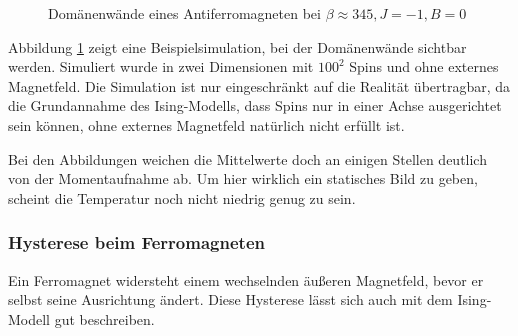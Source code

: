 \begin{figure}[h]
  \hfill
  \caption{Domänenwände eines Antiferromagneten bei $\beta\approx 345, J=-1, B=0$\label{domainwall}}
\end{figure}
Abbildung \ref{domainwall} zeigt eine Beispielsimulation, bei der Domänenwände sichtbar werden.
Simuliert wurde in zwei Dimensionen mit $100^2$ Spins und ohne externes Magnetfeld.
Die Simulation ist nur eingeschränkt auf die Realität übertragbar, da die Grundannahme des Ising-Modells, dass Spins nur in einer Achse ausgerichtet sein können, ohne externes Magnetfeld natürlich nicht erfüllt ist.

Bei den Abbildungen weichen die Mittelwerte doch an einigen Stellen deutlich von der Momentaufnahme ab.
Um hier wirklich ein statisches Bild zu geben, scheint die Temperatur noch nicht niedrig genug zu sein.

\subsubsection{Hysterese beim Ferromagneten}
Ein Ferromagnet widersteht einem wechselnden äußeren Magnetfeld, bevor er selbst seine Ausrichtung ändert.
Diese Hysterese lässt sich auch mit dem Ising-Modell gut beschreiben.

